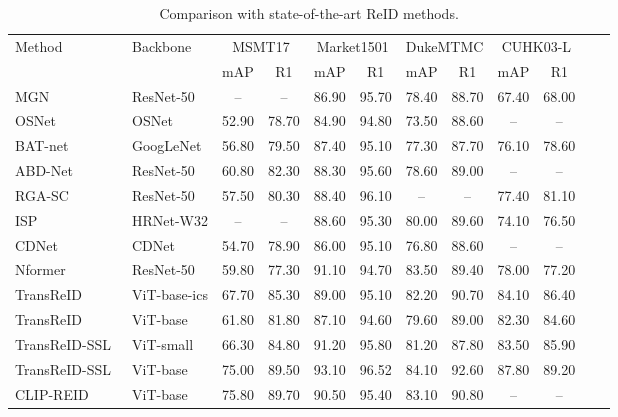 \documentclass[conference]{IEEEtran}
\begin{document}
{\begin{table}[ht!]
\centering
\caption{Comparison with state-of-the-art ReID methods.}
\vspace{0.2cm}
\label{tab: Comparison with Other ReID Methods}
\begin{tabular}{llcccccccccc}
\hline \hline
\multirow{2}{*}{Method} & \multirow{2}{*}{Backbone}   & \multicolumn{2}{c}{MSMT17} & \multicolumn{2}{c}{Market1501} & \multicolumn{2}{c}{DukeMTMC} & \multicolumn{2}{c}{CUHK03-L}  \\  
&       & mAP   & R1   & mAP  & R1      & mAP    & R1  &mAP &R1   \\ \midrule
MGN~\cite{wang2018learning} &  ResNet-50   & --  & --  & 86.90 &95.70  & 78.40 &88.70 & 67.40 & 68.00   \\
OSNet~\cite{zhou2019omni} &  OSNet   & 52.90  & 78.70  & 84.90 &94.80  & 73.50 &88.60 & -- & --   \\
BAT-net~\cite{fang2019bilinear}  & GoogLeNet   &56.80  &79.50  & 87.40 &95.10  &77.30 &87.70 & 76.10 & 78.60   \\
ABD-Net~\cite{chen2019abd}  & ResNet-50  & 60.80 & 82.30 & 88.30 & 95.60 & 78.60 & 89.00 & -- & --  \\
RGA-SC~\cite{zhang2020relation}  &ResNet-50  & 57.50  &80.30  & 88.40  &96.10 & -- & -- &77.40 &81.10   \\
ISP~\cite{zhu2020identity}  & HRNet-W32  & -- & -- & 88.60  &95.30 & 80.00  & 89.60  & 74.10 & 76.50   \\
CDNet~\cite{li2021combined}  & CDNet  & 54.70 & 78.90 & 86.00  &95.10 & 76.80  & 88.60  &-- &--   \\
Nformer~\cite{wang2022nformer}  & ResNet-50   & 59.80 & 77.30 &91.10 & 94.70 &83.50 & 89.40  &78.00 &77.20   \\ 
TransReID~\cite{He_2021_ICCV} &  ViT-base-ics   & 67.70  & 85.30  & 89.00 &95.10  & 82.20 &90.70 & 84.10 & 86.40   \\
TransReID &  ViT-base   & 61.80  & 81.80  & 87.10 &94.60  & 79.60 &89.00 & 82.30 & 84.60   \\
TransReID-SSL~\cite{luo2021self} &  ViT-small   & 66.30  & 84.80  & 91.20 & 95.80  & 81.20 &87.80 & 83.50 & 85.90     \\ 
TransReID-SSL &  ViT-base   & 75.00  & 89.50  & 93.10 &96.52  & 84.10 &92.60 & 87.80 & 89.20   \\
CLIP-REID~\cite{li2023clip} &  ViT-base   & 75.80  & 89.70  & 90.50 &95.40  & 83.10 &90.80 & -- & --   \\

\end{tabular}
\end{table}}
\end{document}

